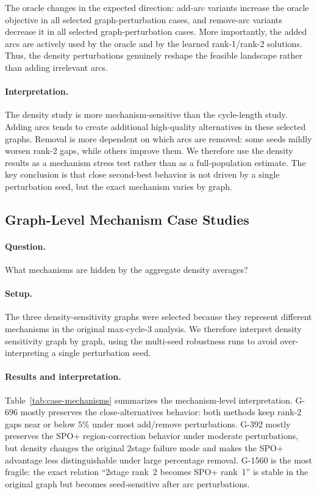 The oracle changes in the expected direction: add-arc variants increase the
oracle objective in all selected graph-perturbation cases, and remove-arc
variants decrease it in all selected graph-perturbation cases. More importantly,
the added arcs are actively used by the oracle and by the learned rank-1/rank-2
solutions. Thus, the density perturbations genuinely reshape the feasible
landscape rather than adding irrelevant arcs.

\paragraph{Interpretation.}
The density study is more mechanism-sensitive than the cycle-length study.
Adding arcs tends to create additional high-quality alternatives in these
selected graphs. Removal is more dependent on which arcs are removed: some
seeds mildly worsen rank-2 gaps, while others improve them. We therefore use
the density results as a mechanism stress test rather than as a full-population
estimate. The key conclusion is that close second-best behavior is not driven by
a single perturbation seed, but the exact mechanism varies by graph.

\FloatBarrier

\subsection{Graph-Level Mechanism Case Studies}

\paragraph{Question.}
What mechanisms are hidden by the aggregate density averages?

\paragraph{Setup.}
The three density-sensitivity graphs were selected because they represent
different mechanisms in the original max-cycle-3 analysis. We therefore
interpret density sensitivity graph by graph, using the multi-seed robustness
runs to avoid over-interpreting a single perturbation seed.

\paragraph{Results and interpretation.}
Table~\ref{tab:case-mechanisms} summarizes the mechanism-level interpretation.
G-696 mostly preserves the close-alternatives behavior: both methods keep
rank-2 gaps near or below $5\%$ under most add/remove perturbations. G-392
mostly preserves the SPO+ region-correction behavior under moderate
perturbations, but density changes the original 2stage failure mode and makes
the SPO+ advantage less distinguishable under large percentage removal. G-1560
is the most fragile: the exact relation ``2stage rank~2 becomes SPO+ rank~1''
is stable in the original graph but becomes seed-sensitive after arc
perturbations.

